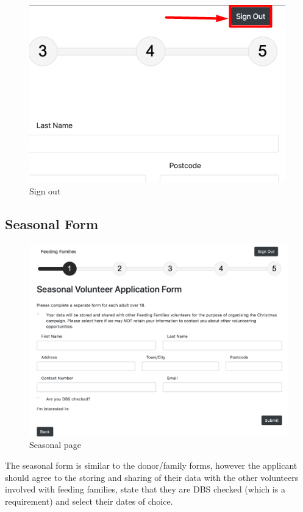 \documentclass[12pt]{article}
\begin{document}
\begin{figure}[h]
    \centering
    \includegraphics{main/signout.png}
    \caption{Sign out}
    \label{fig8}
\end{figure}
\newpage

\subsection{Seasonal Form}
\begin{figure}[h]
    \centering
    \hspace*{-2cm}\includegraphics[scale=0.4]{main/seasonal.png}
    \caption{Seasonal page}
    \label{fig9}
\end{figure}

The seasonal form is similar to the donor/family forms, however the applicant should agree to the storing and sharing of their data with the other volunteers involved with feeding families, state that they are DBS checked (which is a requirement) and select their dates of choice.
\end{document}
